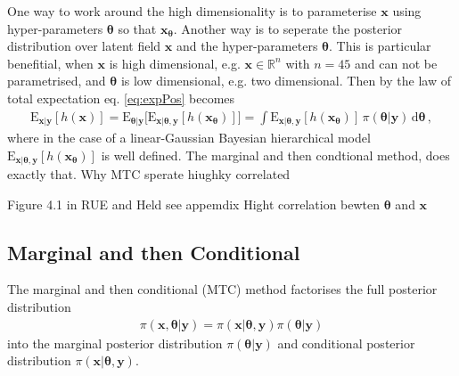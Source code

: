 One way to work around the high dimensionality is to parameterise $\bm{x}$ using hyper-parameters $\bm{\theta}$ so that $\bm{x}_{\bm{\theta}}$. 
Another way is to seperate the posterior distribution over latent field $\bm{x}$ and the hyper-parameters $\bm{\theta}$.
This is particular benefitial, when $\bm{x}$ is high dimensional, e.g. $\bm{x} \in \mathbb{R}^n$ with $n = 45$ and can not be parametrised, and $\bm{\theta}$ is low dimensional, e.g. two dimensional.
Then by the law of total expectation \cite{champ2022generalizedlawtotalcovariance} eq. \ref{eq:expPos} becomes
\begin{align}
	\text{E}_{\bm{x}|\bm{y}} [h(\bm{x})] = \text{E}_{\bm{\theta}|\bm{y}}   \big[ \text{E}_{\bm{x}|\bm{\theta},\bm{y}} [h(\bm{x}_{\bm{\theta}})] \big]=  \int 	\text{E}_{\bm{x}| \bm{\theta},\bm{y}}  [h(\bm{x}_{\bm{\theta}})] \,  \pi( \bm{\theta} | \bm{y} )  \, \text{d} \bm{\theta}   \label{eq:MargExpPos} \, ,
\end{align}
where in the case of a linear-Gaussian Bayesian hierarchical model $\text{E}_{\bm{x}| \bm{\theta},\bm{y}}  [h(\bm{x}_{\bm{\theta}})]$ is well defined.
The marginal and then condtional method, does exactly that.
Why MTC sperate hiughky correlated \cite{}

Figure 4.1 in RUE and Held  see appemdix
Hight correlation bewten $\bm{\theta}$ and $\bm{x}$

\subsection{Marginal and then Conditional}
\label{subsec:MTC}
The marginal and then conditional (MTC) method factorises the full posterior distribution 
\begin{align}
	\pi(\bm{x}, \bm{\theta}|\bm{y}) = \pi(\bm{x}| \bm{\theta}, \bm{y}) \pi(\bm{\theta}|\bm{y})
\end{align}
into the marginal posterior distribution $ \pi(\bm{\theta}|\bm{y})$ and conditional posterior distribution $\pi(\bm{x}| \bm{\theta}, \bm{y})$.


